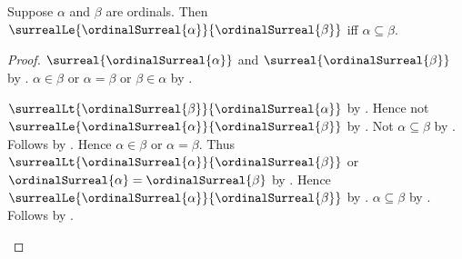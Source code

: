 \begin{proposition}\label{ordinal_surreal_le_iff}
    Suppose $\alpha$ and $\beta$ are ordinals.
    Then $\surrealLe{\ordinalSurreal{\alpha}}{\ordinalSurreal{\beta}}$ iff
        $\alpha\subseteq\beta$.
\end{proposition}
\begin{proof}
    $\surreal{\ordinalSurreal{\alpha}}$ and
        $\surreal{\ordinalSurreal{\beta}}$
        by .
    $\alpha\in\beta$ or $\alpha=\beta$ or $\beta\in\alpha$
        by .
    \begin{byCase}
            $\surrealLt{\ordinalSurreal{\beta}}
                {\ordinalSurreal{\alpha}}$
                by .
            Hence not
                $\surrealLe{\ordinalSurreal{\alpha}}
                    {\ordinalSurreal{\beta}}$
                by
                .
            Not $\alpha\subseteq\beta$
                by .
            Follows by \auto.
            Hence $\alpha\in\beta$ or $\alpha=\beta$.
            Thus
                $\surrealLt{\ordinalSurreal{\alpha}}
                    {\ordinalSurreal{\beta}}$ or
                $\ordinalSurreal{\alpha}=\ordinalSurreal{\beta}$
                by .
            Hence
                $\surrealLe{\ordinalSurreal{\alpha}}
                    {\ordinalSurreal{\beta}}$
                by .
            $\alpha\subseteq\beta$
                by
                .
            Follows by \auto.
    \end{byCase}
\end{proof}

